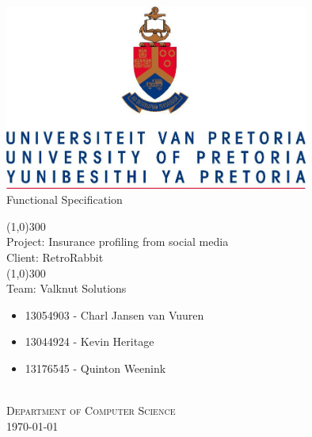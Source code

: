 \documentclass{article}
\begin{document}
	\begin{titlepage}
		\begin{center}
			\includegraphics[width=10cm]{images/UP.jpg}  \\
			[0.5cm]
			\huge{
			Functional Specification\\
			}

			\line(1,0){300}\\
			[0.2cm]
			\LARGE{Project: Insurance profiling from social media\\
			Client: RetroRabbit} \\
			\line(1,0){300}\\
			\LARGE{Team: Valknut Solutions}\\
			[1.0cm]
			\large
			{
			\begin{itemize}
				\item 13054903 - Charl Jansen van Vuuren
				\item 13044924 - Kevin Heritage
				\item 13176545 - Quinton Weenink\\
			\end{itemize}
			}
			\textsc{\large}\\
		[3.0cm]
		\textsc{\large  Department of Computer Science}\\
		[0.5cm]
		\textsc{\large \today}\\
		\end{center}


	\end{titlepage}
	\cleardoublepage
	\tableofcontents
	\cleardoublepage
	\begin{versionhistory}
	\end{versionhistory}
\end{document}
